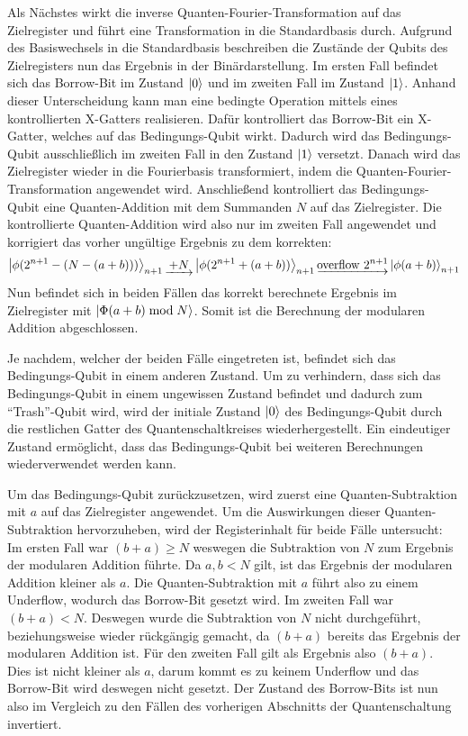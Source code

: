 Als Nächstes wirkt die inverse Quanten-Fourier-Transformation auf das Zielregister und 
führt eine Transformation in die Standardbasis durch.
Aufgrund des Basiswechsels in die Standardbasis beschreiben die Zustände der Qubits des Zielregisters nun das Ergebnis in der Binärdarstellung.
Im ersten Fall befindet sich das Borrow-Bit im Zustand \(\ket{0}\) und im zweiten Fall im Zustand \(\ket{1}\).
Anhand dieser Unterscheidung kann man eine bedingte Operation mittels eines kontrollierten X-Gatters realisieren.
Dafür kontrolliert das Borrow-Bit ein X-Gatter, 
welches auf das Bedingungs-Qubit wirkt.
Dadurch wird das Bedingungs-Qubit ausschließlich im zweiten Fall in den Zustand \(\ket{1}\) versetzt.
Danach wird das Zielregister wieder in die Fourierbasis transformiert, 
indem die Quanten-Fourier-Transformation angewendet wird.
Anschließend kontrolliert das Bedingungs-Qubit eine Quanten-Addition mit dem Summanden \(N\) auf das Zielregister.
Die kontrollierte Quanten-Addition wird also nur im zweiten Fall angewendet und korrigiert das vorher ungültige Ergebnis
zu dem korrekten:
\[
\ket{\phi(2^{n+1}-(N-(a+b)))}_{n+1} \underrightarrow{~+N~} 
\ket{\phi(2^{n+1}+(a+b))}_{n+1} \underrightarrow{\text{overflow }2^{n+1}}
\ket{\phi(a+b)}_{n+1}
  \]
Nun befindet sich in beiden Fällen das korrekt berechnete Ergebnis im Zielregister mit \(\ket{\Phi(a+b)\bmod N}\).
Somit ist die Berechnung der modularen Addition abgeschlossen.

Je nachdem, welcher der beiden Fälle eingetreten ist, 
befindet sich das Bedingungs-Qubit in einem anderen Zustand.
Um zu verhindern, dass sich das Bedingungs-Qubit in einem ungewissen Zustand befindet und dadurch zum "`Trash"'-Qubit wird, 
wird der initiale Zustand \(\ket{0}\) des Bedingungs-Qubit durch die restlichen Gatter des Quantenschaltkreises wiederhergestellt.
Ein eindeutiger Zustand ermöglicht, dass das Bedingungs-Qubit bei weiteren Berechnungen wiederverwendet werden kann.

Um das Bedingungs-Qubit zurückzusetzen, 
wird zuerst eine Quanten-Subtraktion mit \(a\) auf das Zielregister angewendet.
Um die Auswirkungen dieser Quanten-Subtraktion hervorzuheben, wird der Registerinhalt für beide Fälle untersucht:
Im ersten Fall war \((b+a) \geq N\) weswegen die Subtraktion von \(N\) zum Ergebnis der modularen Addition führte.
Da \(a, b < N\) gilt, ist das Ergebnis der modularen Addition kleiner als \(a\).
Die Quanten-Subtraktion mit \(a\) führt also zu einem Underflow, wodurch das Borrow-Bit gesetzt wird.
Im zweiten Fall war \((b+a) < N\).
Deswegen wurde die Subtraktion von \(N\) nicht durchgeführt, 
beziehungsweise wieder rückgängig gemacht, da \((b+a)\) bereits das Ergebnis der modularen Addition ist.
Für den zweiten Fall gilt als Ergebnis also \((b+a)\).
Dies ist nicht kleiner als \(a\), 
darum kommt es zu keinem Underflow und das Borrow-Bit wird deswegen nicht gesetzt.
Der Zustand des Borrow-Bits ist nun also im Vergleich zu den Fällen des vorherigen Abschnitts der Quantenschaltung invertiert.

